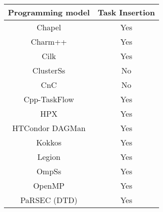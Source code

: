 \begin{tabular}{cc}
\hline
Programming model & Task Insertion \\
\hline
Chapel & Yes\\
Charm++ & Yes\\
Cilk & Yes\\
ClusterSs & No\\
CnC & No\\
Cpp-TaskFlow & Yes\\
HPX & Yes\\
HTCondor DAGMan & Yes\\
Kokkos & Yes\\
Legion & Yes\\
OmpSs & Yes\\
OpenMP & Yes\\
PaRSEC (DTD) & Yes\\
\hline
\end{tabular}
